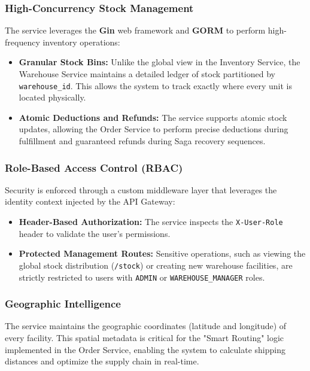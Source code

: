 \documentclass[12pt,a4paper]{report}
\begin{document}
\subsubsection{High-Concurrency Stock Management}
The service leverages the \textbf{Gin} web framework and \textbf{GORM} to perform high-frequency inventory operations:
\begin{itemize}
    \item \textbf{Granular Stock Bins:} Unlike the global view in the Inventory Service, the Warehouse Service maintains a detailed ledger of stock partitioned by \texttt{warehouse\_id}. This allows the system to track exactly where every unit is located physically.
    \item \textbf{Atomic Deductions and Refunds:} The service supports atomic stock updates, allowing the Order Service to perform precise deductions during fulfillment and guaranteed refunds during Saga recovery sequences.
\end{itemize}

\subsubsection{Role-Based Access Control (RBAC)}
Security is enforced through a custom middleware layer that leverages the identity context injected by the API Gateway:
\begin{itemize}
    \item \textbf{Header-Based Authorization:} The service inspects the \texttt{X-User-Role} header to validate the user's permissions. 
    \item \textbf{Protected Management Routes:} Sensitive operations, such as viewing the global stock distribution (\texttt{/stock}) or creating new warehouse facilities, are strictly restricted to users with \texttt{ADMIN} or \texttt{WAREHOUSE\_MANAGER} roles.
\end{itemize}

\subsubsection{Geographic Intelligence}
The service maintains the geographic coordinates (latitude and longitude) of every facility. This spatial metadata is critical for the "Smart Routing" logic implemented in the Order Service, enabling the system to calculate shipping distances and optimize the supply chain in real-time.
\end{document}
